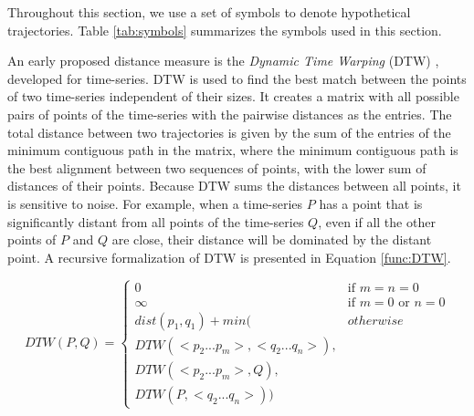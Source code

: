 Throughout this section, we use a set of symbols to denote hypothetical trajectories. Table \ref{tab:symbols} summarizes the symbols used in this section.

\begin{table}[!h]
    \centering
    \caption{Symbol meanings}
    \label{tab:symbols}
\end{table}

An early proposed distance measure is the \emph{Dynamic Time Warping} (DTW) \cite{berndt1994using}, developed for time-series. DTW is used to find the best match between the points of two time-series independent of their sizes. It creates a matrix with all possible pairs of points of the time-series with the pairwise distances as the entries.
The total distance between two trajectories is given by the sum of the entries of the minimum contiguous path in the matrix{, where the minimum contiguous path is the best alignment between two sequences of points, with the lower sum of distances of their points}. Because DTW sums the distances between all points, it is sensitive to noise. For example, when a time-series $P$ has a point that is significantly distant from all points of the time-series $Q$, even if all the other points of $P$ and $Q$ are close, their distance will be dominated by the distant point. A recursive formalization of DTW is presented in Equation \ref{func:DTW}.

\begin{equation}
\label{func:DTW}
  DTW(P, Q) = 
    \begin{cases} 
        0 & \text{if } m = n = 0\\ 
      \infty & \text{if } m = 0 \text{ or } n = 0\\ 
      dist(p_1, q_1) + min( & otherwise\\
      DTW(<p_2...p_m>,<q_2...q_n>),\\
      DTW(<p_2...p_m>, Q), \\
      DTW(P, <q_2...q_n>)) &
    \end{cases}
\end{equation}

